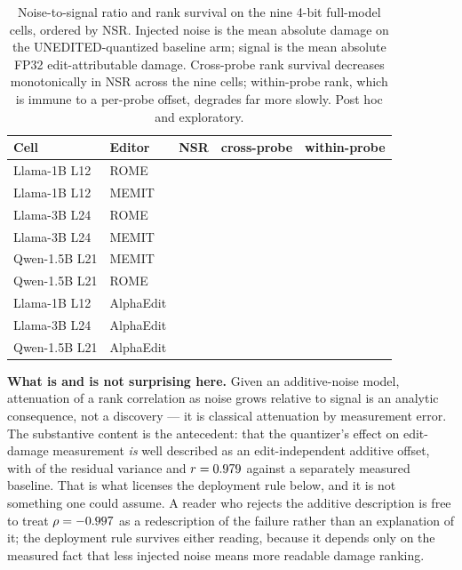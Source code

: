 \documentclass[preprint,12pt]{elsarticle}
\begin{document}
\begin{table}[t]
\centering
\small
\caption{Noise-to-signal ratio and rank survival on the nine 4-bit full-model cells,
ordered by NSR. Injected noise is the mean absolute damage on the UNEDITED-quantized
baseline arm; signal is the mean absolute FP32 edit-attributable damage. Cross-probe
rank survival decreases monotonically in NSR across the nine cells; within-probe rank,
which is immune to a per-probe offset, degrades far more slowly. Post hoc and
exploratory.}
\label{tab:nsr}
\setlength{\tabcolsep}{5pt}
\begin{tabular}{llrrr}
\toprule
Cell & Editor & NSR & cross-probe & within-probe \\
\midrule
Llama-1B L12  & ROME      & \pNsrLOneRome{}   & \pFlatNfFMLOneRome{}    & \pWithinNfFMLOneRome{} \\
Llama-1B L12  & MEMIT     & \pNsrLOneMemit{}  & \pFlatNfFMLOneMemit{}   & \pWithinNfFMLOneMemit{} \\
Llama-3B L24  & ROME      & \pNsrLThreeRome{} & \pFlatNfFMLThreeRome{}  & \pWithinNfFMLThreeRome{} \\
Llama-3B L24  & MEMIT     & \pNsrLThreeMemit{}& \pFlatNfFMLThreeMemit{} & \pWithinNfFMLThreeMemit{} \\
Qwen-1.5B L21 & MEMIT     & \pNsrQOneMemit{}  & \pFlatNfFMQOneMemit{}   & \pWithinNfFMQOneMemit{} \\
Qwen-1.5B L21 & ROME      & \pNsrQOneRome{}   & \pFlatNfFMQOneRome{}    & \pWithinNfFMQOneRome{} \\
Llama-1B L12  & AlphaEdit & \pNsrLOneAlpha{}  & \pFlatNfFMLOneAlpha{}   & \pWithinNfFMLOneAlpha{} \\
Llama-3B L24  & AlphaEdit & \pNsrLThreeAlpha{}& \pFlatNfFMLThreeAlpha{} & \pWithinNfFMLThreeAlpha{} \\
Qwen-1.5B L21 & AlphaEdit & \pNsrQOneAlpha{}  & \pFlatNfFMQOneAlpha{}   & \pWithinNfFMQOneAlpha{} \\
\bottomrule
\end{tabular}
\end{table}

\textbf{What is and is not surprising here.} Given an additive-noise model, attenuation
of a rank correlation as noise grows relative to signal is an analytic consequence, not
a discovery --- it is classical attenuation by measurement error. The substantive
content is the antecedent: that the quantizer's effect on edit-damage measurement
\emph{is} well described as an edit-independent additive offset, with
\pAddShareNfFM{} of the residual variance and $r=0.979{}$ against a separately
measured baseline. That is what licenses the deployment rule below, and it is not
something one could assume. A reader who rejects the additive description is free to
treat $\rho=-0.997{}$ as a redescription of the failure rather than an explanation
of it; the deployment rule survives either reading, because it depends only on the
measured fact that less injected noise means more readable damage ranking.
\end{document}
